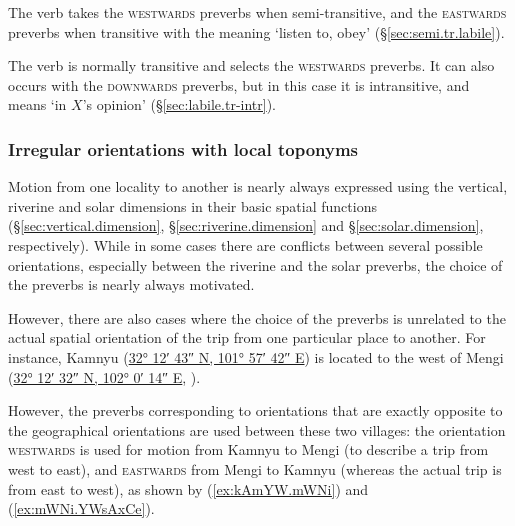 The verb  takes the \textsc{westwards} preverbs when semi-transitive, and the \textsc{eastwards} preverbs when transitive with the meaning `listen to, obey' (§\ref{sec:semi.tr.labile}).  

The verb  is normally transitive and selects the \textsc{westwards} preverbs. It can also occurs with the \textsc{downwards} preverbs, but in this case it is intransitive, and means `in $X$'s opinion' (§\ref{sec:labile.tr-intr}). 

\subsubsection{Irregular orientations with local toponyms} \label{sec:local.toponyms.orientation}
Motion from one locality to another is nearly always expressed using the vertical, riverine and solar dimensions in their basic spatial functions (§\ref{sec:vertical.dimension}, §\ref{sec:riverine.dimension} and §\ref{sec:solar.dimension}, respectively). While in some cases there are conflicts between several possible orientations, especially between the riverine and the solar preverbs, the choice of the preverbs is nearly always motivated.

However, there are also cases where the choice of the preverbs is unrelated to the actual spatial orientation of the trip from one particular place to another. For instance, Kamnyu  (\href{https://geohack.toolforge.org/geohack.php?params=32.21181437468092_N_101.96170811415986_E}{32° 12′ 43″ N, 101° 57′ 42″ E}) is located to the west of Mengi  (\href{https://geohack.toolforge.org/geohack.php?params=32.20892642316477_N_102.00383911415355_E}{32° 12′ 32″ N, 102° 0′ 14″ E}, ). 

However, the preverbs corresponding to orientations that are exactly opposite to the geographical orientations are used between these two villages: the orientation \textsc{westwards} is used for motion from Kamnyu to Mengi (to describe a trip from west to east), and \textsc{eastwards} from Mengi to Kamnyu (whereas the actual trip is from east to west), as shown by (\ref{ex:kAmYW.mWNi}) and (\ref{ex:mWNi.YWsAxCe}).


